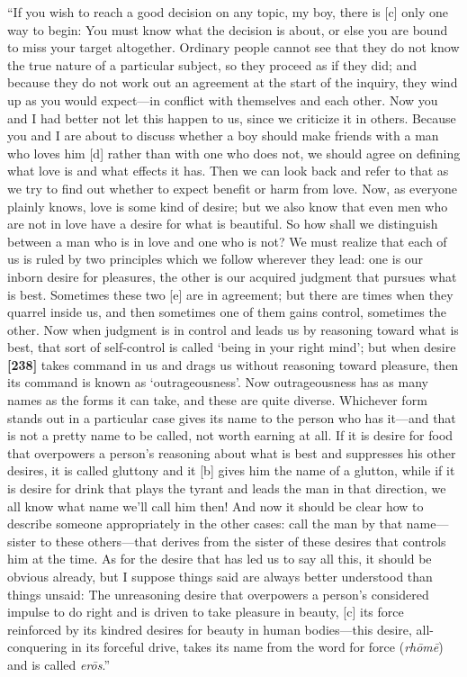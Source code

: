 “If you wish to reach a good decision on any topic, my boy, there is
{[}c{]} only one way to begin: You must know what the decision is about,
or else you are bound to miss your target altogether. Ordinary people
cannot see that they do not know the true nature of a particular
subject, so they proceed as if they did; and because they do not work
out an agreement at the start of the inquiry, they wind up as you would
expect---in conflict with themselves and each other. Now you and I had
better not let this happen to us, since we criticize it in others.
Because you and I are about to discuss whether a boy should make friends
with a man who loves him {[}d{]} rather than with one who does not, we
should agree on defining what love is and what effects it has. Then we
can look back and refer to that as we try to find out whether to expect
benefit or harm from love. Now, as everyone plainly knows, love is some
kind of desire; but we also know that even men who are not in love have
a desire for what is beautiful. So how shall we distinguish between a
man who is in love and one who is not? We must realize that each of us
is ruled by two principles which we follow wherever they lead: one is
our inborn desire for pleasures, the other is our acquired judgment that
pursues what is best. Sometimes these two {[}e{]} are in agreement; but
there are times when they quarrel inside us, and then sometimes one of
them gains control, sometimes the other. Now when judgment is in control
and leads us by reasoning toward what is best, that sort of self-control
is called ‘being in your right mind'; but when desire {\bf {[}238{]}}
takes command in us and drags us without reasoning toward pleasure, then
its command is known as
‘outrageousness'. Now
outrageousness has as many names as the forms it can take, and these are
quite diverse.
Whichever form stands out in a particular case gives its name to the
person who has it---and that is not a pretty name to be called, not
worth earning at all. If it is desire for food that overpowers a
person's reasoning about what is best and suppresses his other desires,
it is called gluttony and it {[}b{]} gives him the name of a glutton,
while if it is desire for drink that plays the tyrant and leads the man
in that direction, we all know what name we'll call him then! And now it
should be clear how to describe someone appropriately in the other
cases: call the man by that name---sister to these others---that derives
from the sister of these desires that controls him at the time. As for
the desire that has led us to say all this, it should be obvious
already, but I suppose things said are always better understood than
things unsaid: The unreasoning desire that overpowers a person's
considered impulse to do right and is driven to take pleasure in beauty,
{[}c{]} its force reinforced by its kindred desires for beauty in human
bodies---this desire, all-conquering in its forceful drive, takes its
name from the word for force ({\em rhōmē}) and is called {\em erōs}.”

